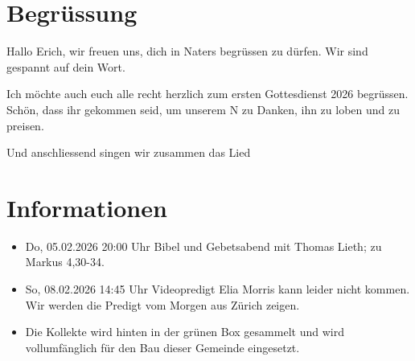\documentclass[fontsize=14pt]{../../inc/mybib}
\newcommand{\Name}{Erich}
\begin{document}
\section{Begrüssung}
Hallo \Name{}, wir freuen uns, dich in Naters begrüssen zu dürfen. Wir sind gespannt auf dein Wort.

Ich möchte auch euch alle recht herzlich zum ersten Gottesdienst 2026 begrüssen. Schön, dass ihr gekommen seid, um unserem \herr N zu Danken, ihn zu loben und zu preisen.

\beten{} Und anschliessend singen wir zusammen das Lied



\section{Informationen}
\begin{itemize}
    \item {} Do, 05.02.2026 20:00 Uhr Bibel und Gebetsabend mit Thomas Lieth; zu Markus 4,30-34.
    \item {} So, 08.02.2026 14:45 Uhr Videopredigt Elia Morris kann leider nicht kommen. Wir werden die Predigt vom Morgen aus Zürich zeigen.
    \item {} Die Kollekte wird hinten in der grünen Box gesammelt und wird vollumfänglich für den Bau dieser Gemeinde eingesetzt.   
\end{itemize}
\end{document}

